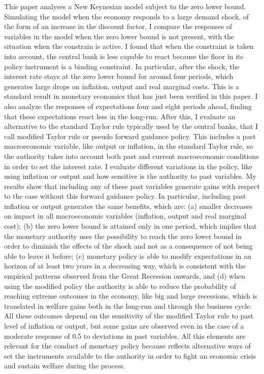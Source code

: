 \documentclass[12pt]{article}
\numberwithin{equation}{section}
\begin{document}
This paper analyses a New Keynesian model subject to the zero lower bound. Simulating the model when the economy responds to a large demand shock, of the form of an increase in the discount factor, I compare  the responses of variables in the model when the zero lower bound is not present, with the situation when the constrain is active. I found that when the constraint is taken into account, the central bank is less capable to react because the floor in its policy instrument is a binding constraint. In particular, after the shock, the interest rate stays at the zero lower bound for around four periods, which generates large drops on inflation, output and real marginal costs. This is a standard result in monetary economics that has just been verified in this paper. I also analyze the responses of expectations four and eight periods ahead, finding that these expectations react less in the long-run. After this, I evaluate an alternative to the standard Taylor rule typically used by the central banks, that I call modified Taylor rule or pseudo forward guidance policy. This includes a past macroeconomic variable, like output or inflation, in the standard Taylor rule, so the authority takes into account both past and current macroeconomic conditions in order to set the interest rate. I evaluate different variations in the policy, like using inflation or output and how sensitive is the authority to past variables. My results show that including any of these past variables generate gains with respect to the case without this forward guidance policy. In particular, including past inflation or output generates the same benefits, which are: (a) smaller decreases on impact in all macroeconomic variables (inflation, output and real marginal cost); (b) the zero lower bound is attained only in one period, which implies that the monetary authority uses the possibility to reach the zero lower bound in order to diminish the effects of the shock and not as a consequence of not being able to leave it before; (c) monetary policy is able to modify expectations in an horizon of at least two years in a decreasing way, which is consistent with the empirical patterns observed from the Great Recession onwards, and (d) when using the modified policy the authority is able to reduce the probability of reaching extreme outcomes in the economy, like big and large recessions, which is translated in welfare gains both in the long-run and through the business cycle. All these outcomes depend on the sensitivity of the modified Taylor rule to past level of inflation or output, but some gains are observed even in the case of a moderate response of 0.5 to deviations in past variables. All this elements are relevant for the conduct of monetary policy because reflects alternative ways of set the instruments available to the authority in order to fight an economic crisis and sustain welfare during the process.
\end{document}
